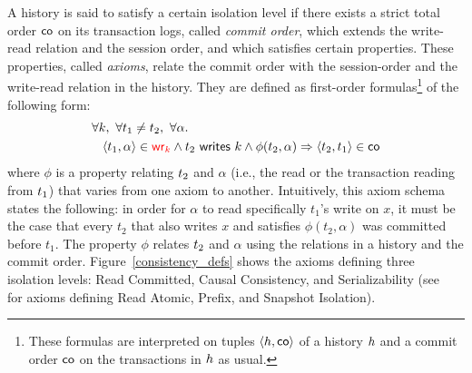 





A history is said to satisfy a certain isolation level if there exists a strict total order $\co$ on its transaction logs, called \emph{commit order}, which extends the write-read relation and the session order, and which satisfies certain properties. These properties, called \emph{axioms}, relate the commit order with the session-order and the write-read relation in the history. 
They are defined as 
first-order formulas\footnote{These formulas are interpreted on tuples $\tup{\hist,\co}$ of a history $\hist$ and a commit order $\co$ on the transactions in $\hist$ as usual.} of the following form:
\begin{align}
  & \forall \key,\ \forall \tr_1\neq \tr_2,\ \forall \alpha.\ \nonumber\\
  & \hspace{3mm}  \tup{\tr_1,\alpha}\in \wro[\key] \land \writeVar{\tr_2}{\key} \land \phi(\tr_2,\alpha) \implies \tup{\tr_2,\tr_1}\in\co \label{eq:axiom}
\end{align}
where $\phi$ is a property relating $\tr_2$ and $\alpha$ (i.e., the read or the transaction reading from $\tr_1$) that varies from one axiom to another. Intuitively, this axiom schema states the following: in order for $\alpha$ to read specifically $t_1$'s write on $x$, it must be the case that every $t_2$ that also writes $x$ and satisfies $\phi(t_2,\alpha)$ was committed before $t_1$. 
The property $\phi$ relates $\tr_2$ and $\alpha$ using the relations in a history and the commit order. 
Figure~\ref{consistency_defs} shows the axioms defining three isolation levels: Read Committed, Causal Consistency, and Serializability (see~\cite{DBLP:journals/pacmpl/BiswasE19} for axioms defining Read Atomic, Prefix, and Snapshot Isolation). 




